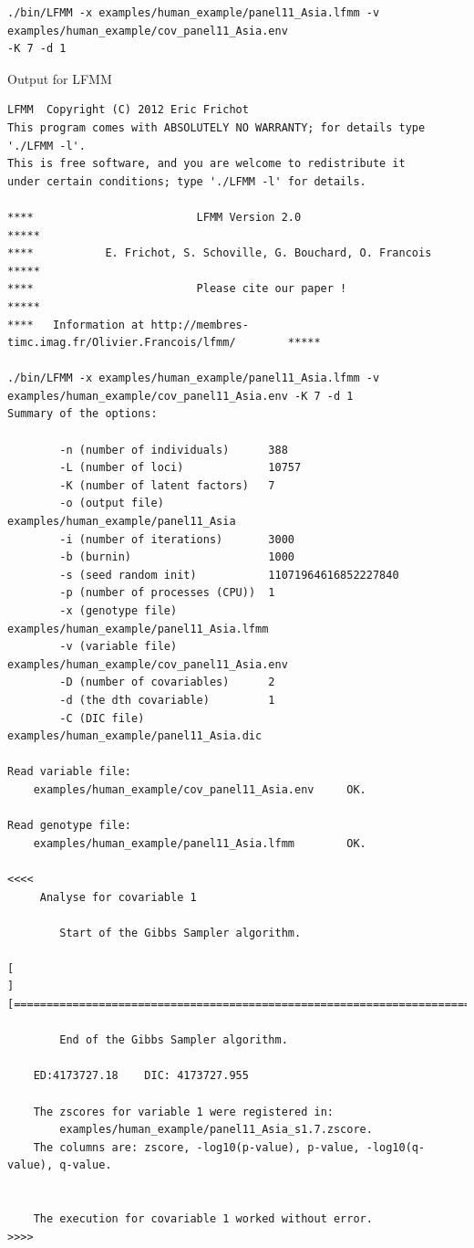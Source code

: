 \documentclass[10pt,a4paper]{article}
\begin{document}
\begin{Verbatim}[frame=single]
./bin/LFMM -x examples/human_example/panel11_Asia.lfmm -v examples/human_example/cov_panel11_Asia.env 
-K 7 -d 1 
\end{Verbatim}
Output for LFMM
\begin{Verbatim}[frame=single]
LFMM  Copyright (C) 2012 Eric Frichot
This program comes with ABSOLUTELY NO WARRANTY; for details type './LFMM -l'.
This is free software, and you are welcome to redistribute it
under certain conditions; type './LFMM -l' for details.

****                         LFMM Version 2.0                                   *****
****           E. Frichot, S. Schoville, G. Bouchard, O. Francois               *****
****                         Please cite our paper !                            *****
****   Information at http://membres-timc.imag.fr/Olivier.Francois/lfmm/        *****

./bin/LFMM -x examples/human_example/panel11_Asia.lfmm -v examples/human_example/cov_panel11_Asia.env -K 7 -d 1 
Summary of the options:

        -n (number of individuals)      388
        -L (number of loci)             10757
        -K (number of latent factors)   7
        -o (output file)                examples/human_example/panel11_Asia
        -i (number of iterations)       3000
        -b (burnin)                     1000
        -s (seed random init)           11071964616852227840
        -p (number of processes (CPU))  1
        -x (genotype file)              examples/human_example/panel11_Asia.lfmm
        -v (variable file)              examples/human_example/cov_panel11_Asia.env
        -D (number of covariables)      2
        -d (the dth covariable)         1
        -C (DIC file)                   examples/human_example/panel11_Asia.dic

Read variable file:
 	examples/human_example/cov_panel11_Asia.env		OK.

Read genotype file:
 	examples/human_example/panel11_Asia.lfmm		OK.

<<<<
	 Analyse for covariable 1

		Start of the Gibbs Sampler algorithm.

[                                                                           ]
[===========================================================================]

		End of the Gibbs Sampler algorithm.

	ED:4173727.18	 DIC: 4173727.955 

	The zscores for variable 1 were registered in:
 		examples/human_example/panel11_Asia_s1.7.zscore.
	The columns are: zscore, -log10(p-value), p-value, -log10(q-value), q-value.


	The execution for covariable 1 worked without error.
>>>>
\end{Verbatim}
\end{document}
